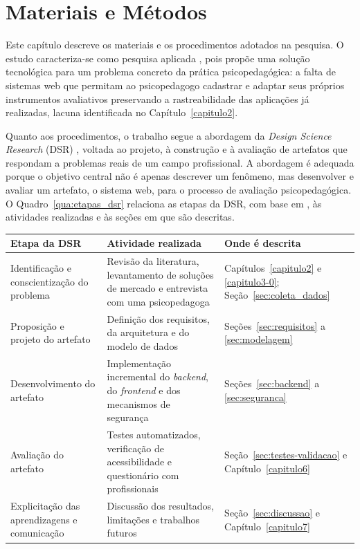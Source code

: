\chapter[Materiais e Métodos]{Materiais e Métodos}\label{capitulo4}

Este capítulo descreve os materiais e os procedimentos adotados na pesquisa. O estudo caracteriza-se como pesquisa aplicada \cite{Gil_2002, Prodanov_Freitas_2013}, pois propõe uma solução tecnológica para um problema concreto da prática psicopedagógica: a falta de sistemas web que permitam ao psicopedagogo cadastrar e adaptar seus próprios instrumentos avaliativos preservando a rastreabilidade das aplicações já realizadas, lacuna identificada no Capítulo~\ref{capitulo2}.

Quanto aos procedimentos, o trabalho segue a abordagem da \textit{Design Science Research} (DSR) \cite{Hevner_2004, Dresch_Lacerda_Antunes_2015}, voltada ao projeto, à construção e à avaliação de artefatos que respondam a problemas reais de um campo profissional. A abordagem é adequada porque o objetivo central não é apenas descrever um fenômeno, mas desenvolver e avaliar um artefato, o sistema web, para o processo de avaliação psicopedagógica. O Quadro~\ref{qua:etapas_dsr} relaciona as etapas da DSR, com base em , às atividades realizadas e às seções em que são descritas.

\begin{quadro}[H]
\centering
\footnotesize
\caption{Etapas da \textit{Design Science Research} e sua correspondência neste trabalho}
\begin{tabular}{|p{3.6cm}|p{7.6cm}|p{3.0cm}|}
\hline
\textbf{Etapa da DSR} & \textbf{Atividade realizada} & \textbf{Onde é descrita} \\ \hline
Identificação e conscientização do problema & Revisão da literatura, levantamento de soluções de mercado e entrevista com uma psicopedagoga & Capítulos~\ref{capitulo2} e \ref{capitulo3-0}; Seção~\ref{sec:coleta_dados} \\ \hline
Proposição e projeto do artefato & Definição dos requisitos, da arquitetura e do modelo de dados & Seções~\ref{sec:requisitos} a \ref{sec:modelagem} \\ \hline
Desenvolvimento do artefato & Implementação incremental do \textit{backend}, do \textit{frontend} e dos mecanismos de segurança & Seções~\ref{sec:backend} a \ref{sec:seguranca} \\ \hline
Avaliação do artefato & Testes automatizados, verificação de acessibilidade e questionário com profissionais & Seção~\ref{sec:testes-validacao} e Capítulo~\ref{capitulo6} \\ \hline
Explicitação das aprendizagens e comunicação & Discussão dos resultados, limitações e trabalhos futuros & Seção~\ref{sec:discussao} e Capítulo~\ref{capitulo7} \\ \hline
\end{tabular}
\label{qua:etapas_dsr}
\end{quadro}

